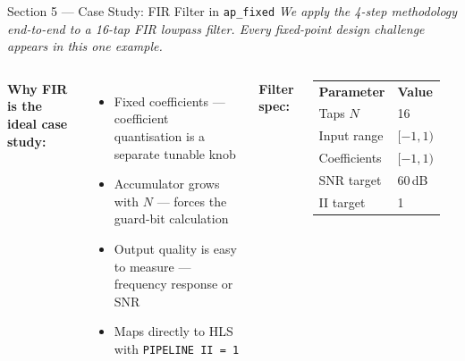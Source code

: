 \documentclass[aspectratio=169,12pt]{beamer}
\begin{document}
\begin{frame}{Section 5 --- Case Study: FIR Filter in \texttt{ap\_fixed}}
\vspace{0.05cm}
{\color{MidGray}\small\itshape
  We apply the 4-step methodology end-to-end to a 16-tap FIR lowpass filter.
  Every fixed-point design challenge appears in this one example.}
\vspace{0.1cm}
\begin{columns}[T,totalwidth=\textwidth]
  {\color{Navy}\bfseries Why FIR is the ideal case study:}
  \begin{itemize}\setlength{\itemsep}{2pt}
    \item[\color{Navy}$\blacktriangleright$]
      Fixed coefficients --- coefficient quantisation is a separate tunable knob
    \item[\color{Orange}$\blacktriangleright$]
      Accumulator grows with $N$ --- forces the guard-bit calculation
    \item[\color{Teal}$\blacktriangleright$]
      Output quality is easy to measure --- frequency response or SNR
    \item[\color{GreenHi}$\blacktriangleright$]
      Maps directly to HLS with \texttt{PIPELINE II\,=\,1}
  \end{itemize}
  {\color{Navy}\bfseries Filter spec:}
  \vspace{2pt}
  {\setlength{\extrarowheight}{1pt}
  \begin{tabular}{ll}
  \rowcolor{Navy!15}
  \textbf{Parameter} & \textbf{Value}\\
  Taps $N$ & 16 \\
  Input range & $[-1, 1)$ \\
  Coefficients & $[-1, 1)$ \\
  SNR target & 60\,dB \\
  II target & 1 \\
  \end{tabular}}
\end{columns}
\end{frame}
\end{document}
